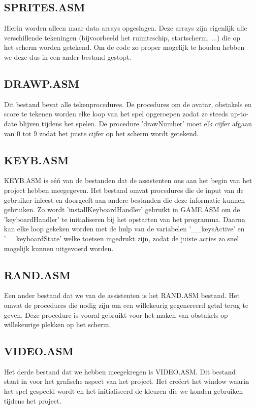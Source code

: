 \documentclass{article}
\begin{document}
\subsection{SPRITES.ASM}\label{sprites_asm}
Hierin worden alleen maar data arrays opgeslagen. Deze arrays zijn eigenlijk alle verschillende tekeningen (bijvoorbeeld het ruimteschip, startscherm, ...) die op het scherm worden getekend. Om de code zo proper mogelijk te houden hebben we deze dus in een ander bestand gestopt.

\subsection{DRAWP.ASM}\label{drawp_asm}
Dit bestand bevat alle tekenprocedures. 
De procedures om de avatar, obstakels en score te tekenen worden elke loop van het spel opgeroepen zodat ze steeds up-to-date blijven tijdens het spelen.
De procedure 'drawNumber' moet elk cijfer afgaan van 0 tot 9 zodat het juiste cijfer op het scherm wordt getekend.

\subsection{KEYB.ASM}\label{keyb_asm}
KEYB.ASM is e\'e\'n van de bestanden dat de assistenten ons aan het begin van het project hebben meegegeven.
Het bestand omvat procedures die de input van de gebruiker inleest en doorgeeft aan andere bestanden die deze informatie kunnen gebruiken. Zo wordt 'installKeyboardHandler' gebruikt in 
GAME.ASM om de 'keyboardHandler' te initialiseren bij het opstarten van het programma. Daarna kan elke loop gekeken worden met de hulp van de variabelen '\_\_keysActive' en '\_\_keyboardState' welke toetsen ingedrukt zijn, zodat de juiste acties zo snel mogelijk kunnen uitgevoerd worden.

\subsection{RAND.ASM}\label{rand_asm}
Een ander bestand dat we van de assistenten is het RAND.ASM bestand. Het omvat de procedures die nodig zijn om een willekeurig gegenereerd getal terug te geven. Deze procedure is vooral gebruikt voor het maken van obstakels op willekeurige plekken op het scherm.

\subsection{VIDEO.ASM}\label{video_asm}
Het derde bestand dat we hebben meegekregen is VIDEO.ASM. Dit bestand staat in voor het grafische aspect van het project.
Het cre\"eert het window waarin het spel gespeeld wordt en het initialiseerd de kleuren die we konden gebruiken tijdens het project.
\end{document}
